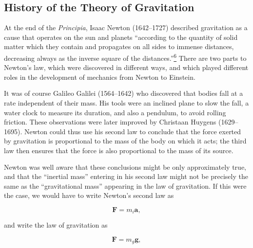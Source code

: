 
\subsection{History of the Theory of Gravitation}\label{sec:1.2}

At the end of the \emph{Principia}, Isaac Newton (1642--1727) described
gravitation as a cause that operates on the sun and planets ``according to the
quantity of solid matter which they contain and propagates on all sides to
immense distances, decreasing always as the inverse square of the
distances.''\hyperref[ch1-ref-6]{\textsuperscript{6}} There are two parts to
Newton's law, which were discovered in different ways, and which played
different roles in the development of mechanics from Newton to Einstein.

It was of course Galileo Galilei (1564--1642) who discovered that bodies fall
at a rate independent of their mass. His tools were an inclined plane to slow
the fall, a water clock to measure its duration, and also a pendulum, to avoid
rolling friction. These observations were later improved by Christaan Huygens
(1629--1695). Newton could thus use his second law to conclude that the force
exerted by gravitation is proportional to the mass of the body on which it
acts; the third law then ensures that the force is also proportional to the
mass of its source.

Newton was well aware that these conclusions might be only approximately
true, and that the ``inertial mass'' entering in his second law might not be
precisely the same as the ``gravitational mass'' appearing in the law of
gravitation. If this were the case, we would have to write Newton's second law
as

\begin{equation}
  \mathbf F=m_i\mathbf a,
  \tag{1.2.1}\label{eq:1.2.1}
\end{equation}

and write the law of gravitation as

\begin{equation}
  \mathbf F=m_g\mathbf g,
  \tag{1.2.2}\label{eq:1.2.2}
\end{equation}


